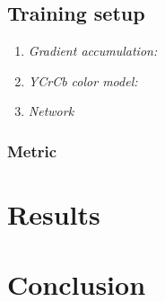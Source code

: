 \documentclass[letterpaper]{article}
\begin{document}
\subsection{Training setup}
\begin{enumerate}
    \item \emph{Gradient accumulation:}
    \item \emph{YCrCb color model:}
    \item \emph{Network }
\end{enumerate}

\subsubsection{Metric}

\section{Results}

\section{Conclusion}

\printbibliography{}
\end{document}
